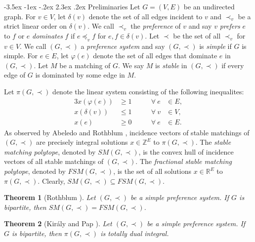 \documentclass[11pt]{article}
\makeatletter
\newtheorem{theorem}{Theorem}%
\numberwithin{theorem}{section}
\renewcommand\section{%
  \@startsection{section}{1}
                {\z@}%
                {-3.5ex \@plus -1ex \@minus -.2ex}%
                {2.3ex \@plus.2ex}%
                {\large\bfseries}%
}
\makeatother
\begin{document}
\section{Preliminaries}
\label{pre}
Let $G=(V,E)$ be an undirected graph. 
For $v\in V$, let $\delta(v)$ denote the set of all edges incident to $v$ and $\prec_v$ be a strict linear order on $\delta(v)$. 
We call $\prec_v$ the \emph{preference} of $v$ and say $v$ \emph{prefers} $e$ to $f$ or $e$ \emph{dominates} $f$ if $e\preceq_v f$ for $e,f\in \delta(v)$. Let $\prec$ be the set of all  $\prec_v$ for $v\in V$.
We call $(G,\prec)$ a \emph{preference system} and say $(G,\prec)$ is \emph{simple} if $G$ is simple.
For $e\in E$, let $\varphi(e)$ denote the set of all edges that dominate $e$ in $(G,\prec)$.
Let $M$ be a matching of $G$. We say $M$ is \emph{stable} in $(G,\prec)$ if every edge of $G$ is dominated by some edge in $M$.

Let $\pi(G,\prec)$ denote the linear system consisting of the following inequalites:
\begin{alignat}{3}
x(\varphi(e)) &\geq 1 &\qquad \forall ~e &\in E,\label{stability constraints}\\
x(\delta(v)) &\leq 1 &\qquad \forall ~v &\in V,\label{matching constraints}\\
x(e) &\geq 0 &\qquad \forall ~e &\in E.\label{edge nonnegativity}
\end{alignat}
As observed by Abeledo and Rothblum \cite{AbelRoth94}, incidence vectors of stable matchings of $(G,\prec)$ are precisely integral solutions $x\in \mathbb{Z}^E$ to $\pi(G,\prec)$.
The \textit{stable matching polytope}, denoted by $SM(G,\prec)$, is the convex hull of incidence vectors of all stable matchings of $(G,\prec)$. The \textit{fractional stable matching polytope}, denoted by $FSM(G,\prec)$, is the set of all solutions $x\in \mathbb{R}^E$ to $\pi(G,\prec)$. Clearly, $SM(G,\prec)\subseteq FSM(G,\prec)$. 

\begin{theorem}[Rothblum \cite{Roth92}]
\label{thm:Roth92}
Let $(G,\prec)$ be a simple preference system. If $G$ is bipartite, then
$SM(G,\prec)=FSM(G,\prec)$.
\end{theorem}

\begin{theorem}[Kir\'{a}ly and Pap \cite{KiraPap08}]
\label{thm:KiraPap08}
Let $(G,\prec)$ be a simple preference system. If $G$ is bipartite, then $\pi(G,\prec)$ is totally dual integral.
\end{theorem}
\end{document}
